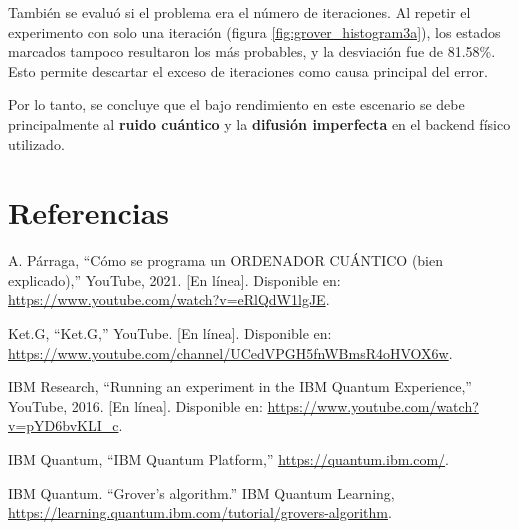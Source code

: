 \documentclass{article}
\begin{document}
También se evaluó si el problema era el número de iteraciones. Al repetir el 
experimento con solo una iteración (figura \ref{fig:grover_histogram3a}), 
los estados marcados tampoco resultaron los más probables, y la desviación fue de 81.58\%. Esto permite descartar el exceso de iteraciones como causa principal del error.

Por lo tanto, se concluye que el bajo rendimiento en este escenario se 
debe principalmente al \textbf{ruido cuántico} y la \textbf{difusión imperfecta} 
en el backend físico utilizado.


\section{Referencias}
\renewcommand{\refname}{}

\begin{thebibliography}{9}

 \label{ref:Teo_Par}
A. Párraga, “Cómo se programa un ORDENADOR CUÁNTICO (bien explicado),” 
YouTube, 2021. [En línea]. Disponible en: 
\url{https://www.youtube.com/watch?v=eRlQdW1lgJE}.

 \label{ref:KetG} Ket.G, “Ket.G,” YouTube. 
[En línea]. Disponible en: \url{https://www.youtube.com/channel/UCedVPGH5fnWBmsR4oHVOX6w}.

 \label{ref:IBM_exp}
IBM Research, “Running an experiment in the IBM Quantum Experience,” 
YouTube, 2016. [En línea]. Disponible en: 
\url{https://www.youtube.com/watch?v=pYD6bvKLI_c}.

 \label{ref:IBM_QUAN} 
IBM Quantum, “IBM Quantum Platform,” \url{https://quantum.ibm.com/}.

 \label{ref:IBM_GROV} IBM Quantum. “Grover's algorithm.” 
IBM Quantum Learning, \url{https://learning.quantum.ibm.com/tutorial/grovers-algorithm}.


\end{thebibliography}
\end{document}

